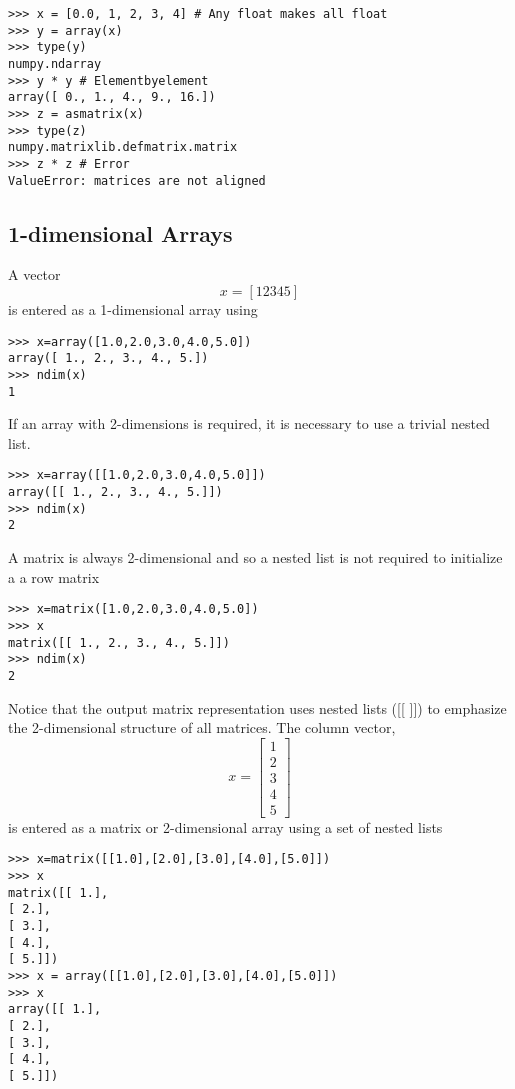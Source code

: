 \documentclass[Pydata.tex]{subfiles}
\begin{document}
\begin{framed}
\begin{verbatim}
>>> x = [0.0, 1, 2, 3, 4] # Any float makes all float
>>> y = array(x)
>>> type(y)
numpy.ndarray
>>> y * y # Elementbyelement
array([ 0., 1., 4., 9., 16.])
>>> z = asmatrix(x)
>>> type(z)
numpy.matrixlib.defmatrix.matrix
>>> z * z # Error
ValueError: matrices are not aligned
\end{verbatim}
\end{framed}
\newpage
\subsection{1-dimensional Arrays}
A vector
\[x = [1 2 3 4 5]\]
is entered as a 1-dimensional array using
\begin{framed}
\begin{verbatim}
>>> x=array([1.0,2.0,3.0,4.0,5.0])
array([ 1., 2., 3., 4., 5.])
>>> ndim(x)
1
\end{verbatim}
\end{framed}
If an array with 2-dimensions is required, it is necessary to use a trivial nested list.
\begin{framed}
\begin{verbatim}
>>> x=array([[1.0,2.0,3.0,4.0,5.0]])
array([[ 1., 2., 3., 4., 5.]])
>>> ndim(x)
2
\end{verbatim}
\end{framed}

A matrix is always 2-dimensional and so a nested list is not required to initialize a a row matrix
\begin{framed}
\begin{verbatim}
>>> x=matrix([1.0,2.0,3.0,4.0,5.0])
>>> x
matrix([[ 1., 2., 3., 4., 5.]])
>>> ndim(x)
2
\end{verbatim}
\end{framed}
Notice that the output matrix representation uses nested lists ([[ ]]) to emphasize the 2-dimensional
structure of all matrices. The column vector,
\[x =
\left[ 
\begin{array}{c}
1 \\
2 \\
3 \\
4 \\
5
\end{array}
\right]
\]
is entered as a matrix or 2-dimensional array using a set of nested lists
\begin{framed}
\begin{verbatim}
>>> x=matrix([[1.0],[2.0],[3.0],[4.0],[5.0]])
>>> x
matrix([[ 1.],
[ 2.],
[ 3.],
[ 4.],
[ 5.]])
>>> x = array([[1.0],[2.0],[3.0],[4.0],[5.0]])
>>> x
array([[ 1.],
[ 2.],
[ 3.],
[ 4.],
[ 5.]])
\end{verbatim}
\end{framed}
\newpage
\end{document}
